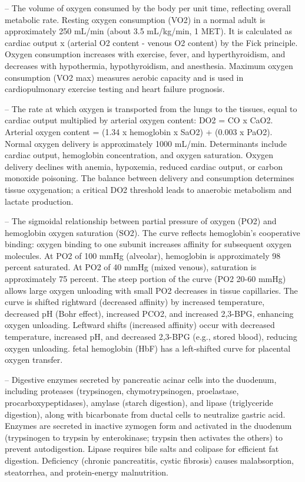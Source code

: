 -- The volume of oxygen consumed by the body per unit time, reflecting overall metabolic rate. Resting oxygen consumption (VO2) in a normal adult is approximately 250 mL/min (about 3.5 mL/kg/min, 1 MET). It is calculated as cardiac output x (arterial O2 content - venous O2 content) by the Fick principle. Oxygen consumption increases with exercise, fever, and hyperthyroidism, and decreases with hypothermia, hypothyroidism, and anesthesia. Maximum oxygen consumption (VO2 max) measures aerobic capacity and is used in cardiopulmonary exercise testing and heart failure prognosis.

-- The rate at which oxygen is transported from the lungs to the tissues, equal to cardiac output multiplied by arterial oxygen content: DO2 = CO x CaO2. Arterial oxygen content = (1.34 x hemoglobin x SaO2) + (0.003 x PaO2). Normal oxygen delivery is approximately 1000 mL/min. Determinants include cardiac output, hemoglobin concentration, and oxygen saturation. Oxygen delivery declines with anemia, hypoxemia, reduced cardiac output, or carbon monoxide poisoning. The balance between delivery and consumption determines tissue oxygenation; a critical DO2 threshold leads to anaerobic metabolism and lactate production.

-- The sigmoidal relationship between partial pressure of oxygen (PO2) and hemoglobin oxygen saturation (SO2). The curve reflects hemoglobin's cooperative binding: oxygen binding to one subunit increases affinity for subsequent oxygen molecules. At PO2 of 100 mmHg (alveolar), hemoglobin is approximately 98 percent saturated. At PO2 of 40 mmHg (mixed venous), saturation is approximately 75 percent. The steep portion of the curve (PO2 20-60 mmHg) allows large oxygen unloading with small PO2 decreases in tissue capillaries. The curve is shifted rightward (decreased affinity) by increased temperature, decreased pH (Bohr effect), increased PCO2, and increased 2,3-BPG, enhancing oxygen unloading. Leftward shifts (increased affinity) occur with decreased temperature, increased pH, and decreased 2,3-BPG (e.g., stored blood), reducing oxygen unloading. fetal hemoglobin (HbF) has a left-shifted curve for placental oxygen transfer.

-- Digestive enzymes secreted by pancreatic acinar cells into the duodenum, including proteases (trypsinogen, chymotrypsinogen, proelastase, procarboxypeptidases), amylase (starch digestion), and lipase (triglyceride digestion), along with bicarbonate from ductal cells to neutralize gastric acid. Enzymes are secreted in inactive zymogen form and activated in the duodenum (trypsinogen to trypsin by enterokinase; trypsin then activates the others) to prevent autodigestion. Lipase requires bile salts and colipase for efficient fat digestion. Deficiency (chronic pancreatitis, cystic fibrosis) causes malabsorption, steatorrhea, and protein-energy malnutrition.

